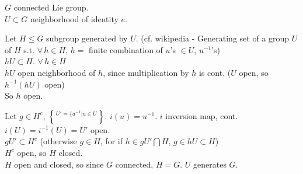 
$G$ connected Lie group.   \\
$U \subset G$ neighborhood of identity $e$.  

Let $H \leq G$ subgroup generated by $U$.  (cf. wikipedia - Generating set of a group $U$ of $H$ s.t. $\forall \, h \in H$, $h = $ finite combination of $u$'s $\in U$, $u^{-1}$'s) \\
$hU \subset H$.  $\forall \, h \in H$ \\
$hU$ open neighborhood of $h$, since multiplication by $h$ is cont. ($U$ open, so $h^{-1}(hU)$ open) \\
So $h$ open. 

Let $g\in H^c$, $U' = \lbrace u^{-1} | u \in U \brace$.  $i(u) = u^{-1}$.  $i$ inversion map, cont.  $i(U) = i^{-1}(U) = U'$ open.   \\
$gU' \subset H^c$ (otherwise $g\in H$, for if $h \in gU' \bigcap H$, $g \in hU \subset H$) \\
$H^c$ open, so $H$ closed.  \\
$H$ open and closed, so since $G$ connected, $H=G$.  $U$ generates $G$.  



